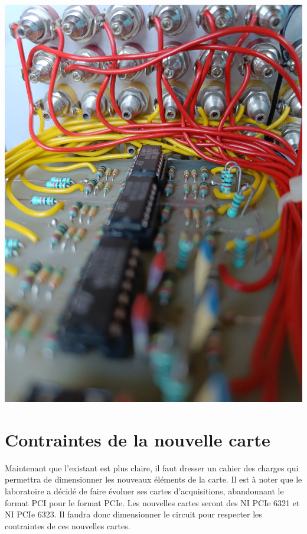 \documentclass{report}
\begin{document}
\begin{minipage}{0.45\textwidth}
\centering
\includegraphics[scale=.0605]{IMAGES/liaison_pcb_old.jpg} 

\label{fig:liaison_pcb_old}
\end{minipage}

\chapter{Contraintes de la nouvelle carte}
\thispagestyle{empty}

Maintenant que l'existant est plus claire, il faut dresser un cahier des charges qui permettra de dimensionner les nouveaux éléments de la carte. Il est à noter que le laboratoire a décidé de faire évoluer ses cartes d'acquisitions, abandonnant le format PCI pour le format PCIe. Les nouvelles cartes seront des NI PCIe 6321 et NI PCIe 6323. Il faudra donc dimensionner le circuit pour respecter les contraintes de ces nouvelles cartes.
\end{document}
